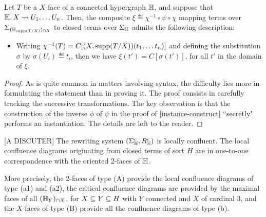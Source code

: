 \begin{lemma} 
  \label{instance-in-context}
Let $T$ be a $X$-face of a connected hypergraph ${\mathbb H}$, and suppose that ${\mathbb H},X\leadsto U_1,\ldots U_n$. 
Then, the composite $\xi\eqdef \chi^{-1}\circ \psi\circ \chi$ mapping terms over $\Sigma_{({\mathbb H}_{\operatorname{supp}(T/X)})_{\cap X}}$ to closed terms over $\Sigma_{{\mathbb H}}$ admits the following description: 
\begin{itemize}
  \item Writing $\chi^{-1}(T)=C[(X,\operatorname{supp}(T/X))(t_1,\ldots t_n)]$ and defining the substitution $\sigma$ by $\sigma(U_i)\eqdef t_i$, then we have $\xi(t')=C[\sigma(t')]$, for all $t'$ in the domain of $\xi$.
\end{itemize}

\end{lemma}

\begin{proof}
As is quite common in matters involving syntax, the difficulty lies more in formulating the statement than in proving it. The proof consists in carefully tracking the successive transformations. 
The key observation is that the construction of the inverse $\phi$ of $\psi$ in the proof of \cref{instance-construct} ``secretly" performs an instantiation. 
The details are left to the reader.
\end{proof}


\begin{thm}
  \label{thm:critical-pairs} [A DISCUTER]
  The rewriting system $(\Sigma_{\mathbb H}^c,R_{\mathbb H}^c)$  is locally confluent. The local confluence diagrams originating from  closed terms of  sort $H$ 
 are in one-to-one correspondence with the oriented 2-faces of ${\mathbb H}$.
 
  More precisely, the 2-faces of type (A) provide  the local confluence diagrams of type (a1) and (a2), the critical confluence diagrams are provided by the maximal  faces of all $({\mathbb H}_Y)_{\cap X}$, for $X\subseteq Y \subseteq H$ with $Y$ connected and $X$ of cardinal 3,
 and the $X$-faces of type (B) provide all  the confluence diagrams of type (b).
\end{thm}

